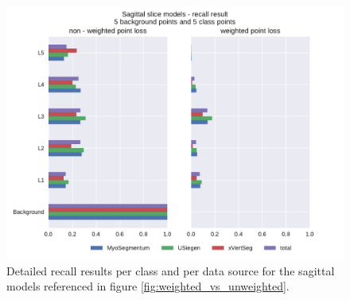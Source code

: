 \begin{figure}
    \centering
    \includegraphics[width=.95\textwidth]{images/perClass_weighted_nonweighted.pdf}
    \caption{
        Detailed recall results per class and per data source for the sagittal models referenced in figure \ref{fig:weighted_vs_unweighted}.
        \label{fig:recall_weighted_vs_unweighted}}
\end{figure}


